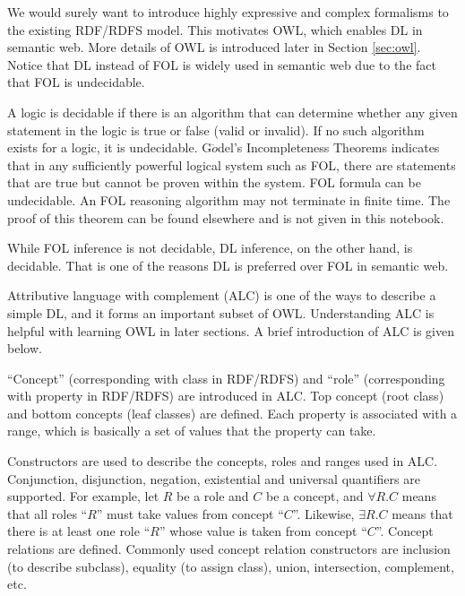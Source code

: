 \begin{shortbox}
	

We would surely want to introduce highly expressive and complex formalisms to the existing RDF/RDFS model. This motivates OWL, which enables DL in semantic web. More details of OWL is introduced later in Section \ref{sec:owl}. Notice that DL instead of FOL is widely used in semantic web due to the fact that FOL is undecidable.

A logic is decidable if there is an algorithm that can determine whether any given statement in the logic is true or false (valid or invalid). If no such algorithm exists for a logic, it is undecidable. G$\ddot{o}$del's Incompleteness Theorems indicates that in any sufficiently powerful logical system such as FOL, there are statements that are true but cannot be proven within the system. FOL formula can be undecidable. An FOL reasoning algorithm may not terminate in finite time. The proof of this theorem can be found elsewhere and is not given in this notebook.

While FOL inference is not decidable, DL inference, on the other hand, is decidable. That is one of the reasons DL is preferred over FOL in semantic web.
	
\end{shortbox}

Attributive language with complement (ALC) is one of the ways to describe a simple DL, and it forms an important subset of OWL. Understanding ALC is helpful with learning OWL in later sections. A brief introduction of ALC is given below.

``Concept'' (corresponding with class in RDF/RDFS) and ``role'' (corresponding with property in RDF/RDFS) are introduced in ALC. Top concept (root class) and bottom concepts (leaf classes) are defined. Each property is associated with a range, which is basically a set of values that the property can take.

Constructors are used to describe the concepts, roles and ranges used in ALC. Conjunction, disjunction, negation, existential and universal quantifiers are supported. For example, let $R$ be a role and $C$ be a concept, and $\forall R.C$ means that all roles ``$R$'' must take values from concept ``$C$''. Likewise, $\exists R.C$ means that there is at least one role ``$R$'' whose value is taken from concept ``$C$''. Concept relations are defined. Commonly used concept relation constructors are inclusion (to describe subclass), equality (to assign class), union, intersection, complement, etc.

